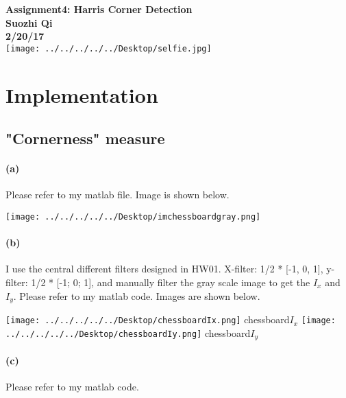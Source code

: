 \documentclass[11pt, oneside]{article}   	%
\begin{document}
\begin{titlepage}
    \centering
    \vfill
    {\bfseries\Large
        Assignment4: Harris Corner Detection\\
        \vskip2cm
        Suozhi Qi\\
        2/20/17\\
    }    
    \vfill
    \texttt{[image: ../../../../../Desktop/selfie.jpg]}
    \vfill
    \vfill
\end{titlepage}

\section{Implementation}
\subsection{"Cornerness" measure}
\paragraph{(a)} Please refer to my matlab file. Image is shown below.
\begin{center}
\texttt{[image: ../../../../../Desktop/imchessboardgray.png]}
\end{center}

\paragraph{(b)} I use the central different filters designed in HW01. X-filter: 1/2 * [-1, 0, 1], y-filter: 1/2 * [-1; 0; 1], and manually filter the gray scale image to get the $I_{x}$ and $I_{y}$. Please refer to my matlab code. Images are shown below.
\begin{center}
\texttt{[image: ../../../../../Desktop/chessboardIx.png]}
\newline{}chessboard$I_{x}$\newline\newline
\texttt{[image: ../../../../../Desktop/chessboardIy.png]}
\newline{}chessboard$I_{y}$\newline\newline
\end{center}

\paragraph{(c)} Please refer to my matlab code. 
\end{document}
